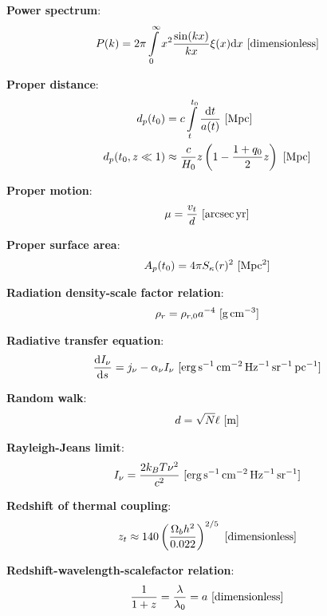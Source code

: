 \documentclass[a4paper,11pt]{article}
\begin{document}
{\noindent}\textbf{Power spectrum}:
\begin{align*}
    P(k) = 2\pi \int\limits_0^\infty x^2\frac{\sin(kx)}{kx}\xi(x)\mathrm{d}x ~ [{\rm dimensionless}]
\end{align*}

{\noindent}\textbf{Proper distance}:
\begin{align*}
    d_p(t_0) &= c\int\limits_t^{t_0}\frac{\mathrm{d}t}{a(t)} ~ [{\rm Mpc}] \\
    d_p(t_0,z\ll1) &\approx \frac{c}{H_0}z \left(1-\frac{1+q_0}{2}z\right) ~ [{\rm Mpc}]
\end{align*}

{\noindent}\textbf{Proper motion}:
\begin{align*}
    \mu = \frac{v_t}{d} ~ [{\rm arcsec\,yr}]
\end{align*}

{\noindent}\textbf{Proper surface area}:
\begin{align*}
    A_p(t_0) = 4\pi S_\kappa(r)^2 ~ [{\rm Mpc^2}]
\end{align*}

{\noindent}\textbf{Radiation density-scale factor relation}:
\begin{align*}
    \rho_r = \rho_{r,0}a^{-4} ~ [{\rm g\,cm^{-3}}]
\end{align*}

{\noindent}\textbf{Radiative transfer equation}:
\begin{align*}
    \frac{\mathrm{d}I_\nu}{\mathrm{d}s} = j_\nu - \alpha_\nu I_\nu ~ [{\rm erg\,s^{-1}\,cm^{-2}\,Hz^{-1}\,sr^{-1}\,pc^{-1}}]
\end{align*}

{\noindent}\textbf{Random walk}:
\begin{align*}
    d = \sqrt{N}\ell ~ [{\rm m}]
\end{align*}

{\noindent}\textbf{Rayleigh-Jeans limit}:
\begin{align*}
    I_\nu = \frac{2k_BT\nu^2}{c^2} ~ [{\rm erg\,s^{-1}\,cm^{-2}\,Hz^{-1}\,sr^{-1}}]
\end{align*}

{\noindent}\textbf{Redshift of thermal coupling}:
\begin{align*}
    z_t \approx 140\left(\frac{\Omega_bh^2}{0.022}\right)^{2/5} ~ [{\rm dimensionless}]
\end{align*}

{\noindent}\textbf{Redshift-wavelength-scalefactor relation}:
\begin{align*}
    \frac{1}{1+z} = \frac{\lambda}{\lambda_0} = a ~ [{\rm dimensionless}]
\end{align*}
\end{document}
